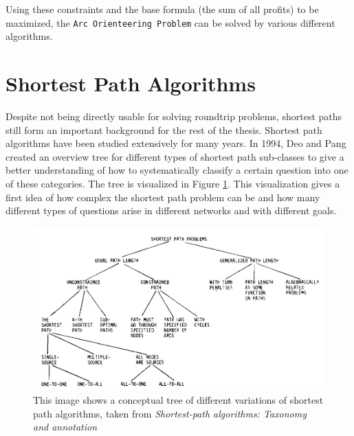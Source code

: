 %
%

Using these constraints and the base formula (the sum of all profits) to be maximized, the \texttt{Arc Orienteering Problem} can be solved by various different algorithms.


\section{Shortest Path Algorithms}
\label{sec:shortestPath}

Despite not being directly usable for solving roundtrip problems, shortest paths still form an important background for the rest of the thesis. 
Shortest path algorithms have been studied extensively for many years.
In 1994, Deo and Pang \cite{deo_shortest-path_1984} created an overview tree for different types of shortest path sub-classes to give a better understanding of  how to systematically classify a certain question into one of these categories.
The tree is visualized in Figure \ref{fig:shortestPathTaxonomy}.
This visualization gives a first idea of how complex the shortest path problem can be and how many different types of questions arise in different networks and with different goals.


\begin{figure}
	\centering
	\includegraphics[width=\linewidth]{bilder/shortest path variants tree (Shortest-path algorithms Taxonomy and annotation).png}
	\caption{This image shows a conceptual tree of different variations of shortest path algorithms, taken from \textit{Shortest-path algorithms: Taxonomy and annotation} \cite{deo_shortest-path_1984}}
	\label{fig:shortestPathTaxonomy}	
\end{figure}

